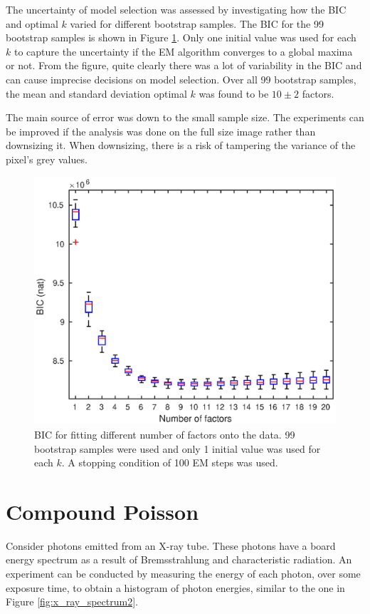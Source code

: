 \documentclass[12pt]{report}
\begin{document}
The uncertainty of model selection was assessed by investigating how the BIC and optimal $k$ varied for different bootstrap samples. The BIC for the 99 bootstrap samples is shown in Figure \ref{fig:initial_factor_BIC_bootstrap}. Only one initial value was used for each $k$ to capture the uncertainty if the EM algorithm converges to a global maxima or not. From the figure, quite clearly there was a lot of variability in the BIC and can cause imprecise decisions on model selection. Over all 99 bootstrap samples, the mean and standard deviation optimal $k$ was found to be $10\pm2$ factors.

The main source of error was down to the small sample size. The experiments can be improved if the analysis was done on the full size image rather than downsizing it. When downsizing, there is a risk of tampering the variance of the pixel's grey values.

\begin{figure}
	\centering
	\includegraphics[width=\textwidth]{figures/initial_factor_BIC_bootstrap.eps}
	\caption{BIC for fitting different number of factors onto the data. 99 bootstrap samples were used and only 1 initial value was used for each $k$. A stopping condition of 100 EM steps was used.}
	\label{fig:initial_factor_BIC_bootstrap}
\end{figure}

\section{Compound Poisson}
Consider photons emitted from an X-ray tube. These photons have a board energy spectrum as a result of Bremsstrahlung and characteristic radiation. An experiment can be conducted by measuring the energy of each photon, over some exposure time, to obtain a histogram of photon energies, similar to the one in Figure \ref{fig:x_ray_spectrum2}.
\end{document}
